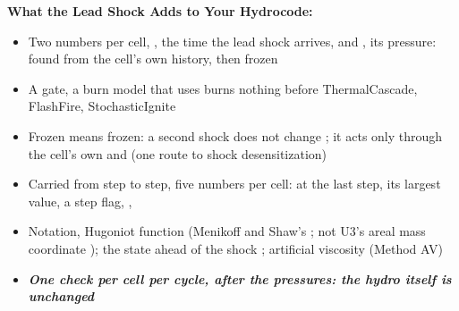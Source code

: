 \documentclass[11pt,addpoints]{exam}
\begin{document}
\begin{tcolorbox}[breakable]
\textbf{What the Lead Shock Adds to Your Hydrocode:}\vspace{.5em}
\begin{itemize}
\item Two numbers per cell, \hspace{3mm} , the time the lead shock arrives, \hspace{2mm} and , its pressure: \hspace{2mm} found from the cell's own history, then frozen\vspace{.5em}
\item A gate, \hspace{3mm} a burn model that uses  burns nothing before  \hspace{7mm} ThermalCascade, FlashFire, StochasticIgnite\vspace{.5em}
\item Frozen means frozen: \hspace{2mm} a second shock does not change ; it acts only through the cell's own  and  \hspace{3mm} (one route to shock desensitization)\vspace{.5em}
\item Carried from step to step, \hspace{3mm} five numbers per cell: \hspace{2mm}  at the last step, its largest value, a step flag, , \vspace{.5em}
\item Notation, \hspace{3mm} Hugoniot function  (Menikoff and Shaw's ; not U3's areal mass coordinate ); \hspace{2mm} the state ahead of the shock ; \hspace{2mm} artificial viscosity  (Method AV)\vspace{.5em}
\item \textbf{\emph{One check per cell per cycle, after the pressures: the hydro itself is unchanged}}
\end{itemize}
\end{tcolorbox}


\clearpage
\end{document}
